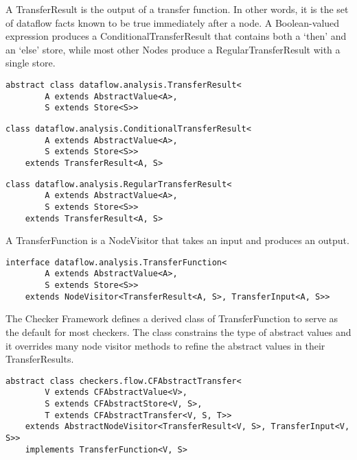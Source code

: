 \label{sec:transfer_result_classes}

    A TransferResult is the output of a transfer function.  In other words, it is the set of dataflow facts known to be true immediately after a node.  A Boolean-valued expression produces a ConditionalTransferResult that contains both a `then' and an `else' store, while most other Nodes produce a RegularTransferResult with a single store.

    \begin{verbatim}abstract class dataflow.analysis.TransferResult<
        A extends AbstractValue<A>,
        S extends Store<S>>\end{verbatim}
        
    \begin{verbatim}class dataflow.analysis.ConditionalTransferResult<
        A extends AbstractValue<A>,
        S extends Store<S>>
    extends TransferResult<A, S>\end{verbatim}

    \begin{verbatim}class dataflow.analysis.RegularTransferResult<
        A extends AbstractValue<A>,
        S extends Store<S>>
    extends TransferResult<A, S>\end{verbatim}

\label{sec:transfer_function_classes}

    A TransferFunction is a NodeVisitor that takes an input and produces an output.

    \begin{verbatim}interface dataflow.analysis.TransferFunction<
        A extends AbstractValue<A>,
        S extends Store<S>>
    extends NodeVisitor<TransferResult<A, S>, TransferInput<A, S>>\end{verbatim}

    The Checker Framework defines a derived class of TransferFunction to serve as the default for most checkers.  The class constrains the type of abstract values and it overrides many node visitor methods to refine the abstract values in their TransferResults.

    \begin{verbatim}abstract class checkers.flow.CFAbstractTransfer<
        V extends CFAbstractValue<V>,
        S extends CFAbstractStore<V, S>,
        T extends CFAbstractTransfer<V, S, T>>
    extends AbstractNodeVisitor<TransferResult<V, S>, TransferInput<V, S>>
    implements TransferFunction<V, S>\end{verbatim}


